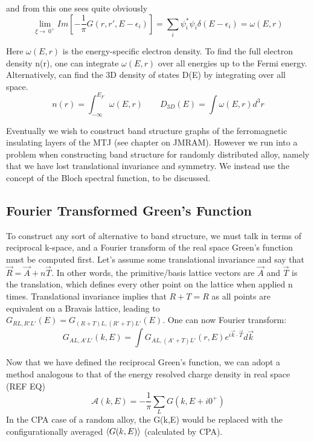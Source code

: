 \documentclass[12pt]{article}
\begin{document}
and from this one sees quite obviously
\begin{equation} \label{4.1} \tag{4.13}
\lim_{\xi\to\ 0^+}Im[-\frac{1}{\pi}G(r,r',E-\epsilon_i)]=\sum_i \psi^*_i\psi_i \delta(E-\epsilon_i)=\omega(E,r)
\end{equation}


Here $\omega(E,r)$ is the energy-specific electron density. To find the full electron density n(r), one can integrate $\omega(E,r)$ over all energies up to the Fermi energy. Alternatively, can find the 3D density of states D(E) by integrating over all space. 
\begin{equation} \label{4.1} \tag{4.13}
n(r)=\int_{-\infty}^{E_F}\omega(E,r) \qquad D_{3D}(E)=\int \omega(E,r) d^3r
\end{equation}

Eventually we wish to construct band structure graphs of the ferromagnetic insulating layers of the MTJ (see chapter on JMRAM). However we run into a problem when constructing band structure for randomly distributed alloy, namely that we have lost translational invariance and symmetry. We instead use the concept of the Bloch spectral function, to be discussed.

\subsection{Fourier Transformed Green's Function}

To construct any sort of alternative to band structure, we must talk in terms of reciprocal k-space, and a Fourier transform of the real space Green's function must be computed first. Let's assume some translational invariance and say that $\vec{R}=\vec{A}+n\vec{T}$. In other words, the primitive/basis lattice vectors are $\vec{A}$ and $\vec{T}$ is the translation, which defines every other point on the lattice when applied n times. Translational invariance implies that $R+T=R$ as all points are equivalent on a Bravais lattice, leading to $G_{RL,R'L'}(E)=G_{(R+T)L,(R'+T)L'}(E)$. One can now Fourier transform:
\begin{equation} \label{4.1} \tag{4.14}
G_{AL,A'L'}(k,E)=\int G_{AL,(A'+T)L'}(r,E)e^{i\vec{k}\cdot \vec{T}} d\vec{k}
\end{equation}

Now that we have defined the reciprocal Green's function, we can adopt a method analogous to that of the energy resolved charge density in real space (REF EQ)
\begin{equation} \label{4.1} \tag{4.15}
\mathcal{A}(k,E)=-\frac{1}{\pi} \sum_L G(k,E+i0^+)
\end{equation}
In the CPA case of a random alloy, the G(k,E) would be replaced with the configurationally averaged $\expval{G(k,E)}$ (calculated by CPA).
\end{document}
